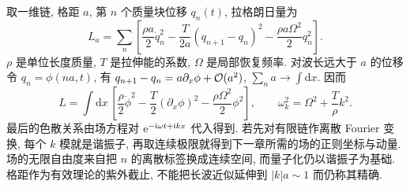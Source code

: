 取一维链, 格距 $a$, 第 $n$ 个质量块位移 $q_n(t)$, 拉格朗日量为
\[
L_a=\sum_n\left[\frac{\rho a}{2}\dot q_n^2-\frac{T}{2a}(q_{n+1}-q_n)^2-\frac{\rho a\Omega^2}{2}q_n^2\right].
\]
$\rho$ 是单位长度质量, $T$ 是拉伸能的系数, $\Omega$ 是局部恢复频率. 对波长远大于 $a$ 的位移令 $q_n=\phi(na,t)$, 有 $q_{n+1}-q_n=a\partial_x\phi+\mathcal O(a^2)$, $\sum_n a\to\int\mathrm dx$. 因而
\[
L=\int\mathrm dx\,\left[\frac\rho2\dot\phi^2-\frac T2(\partial_x\phi)^2-\frac{\rho\Omega^2}{2}\phi^2\right],\qquad
\omega_k^2=\Omega^2+\frac T\rho k^2.
\]
最后的色散关系由场方程对 $\mathrm e^{-\mathrm i\omega t+\mathrm i kx}$ 代入得到. 若先对有限链作离散 Fourier 变换, 每个 $k$ 模就是谐振子, 再取连续极限就得到下一章所需的场的正则坐标与动量. 场的无限自由度来自把 $n$ 的离散标签换成连续空间, 而量子化仍以谐振子为基础. 格距作为有效理论的紫外截止, 不能把长波近似延伸到 $|k|a\sim1$ 而仍称其精确.
